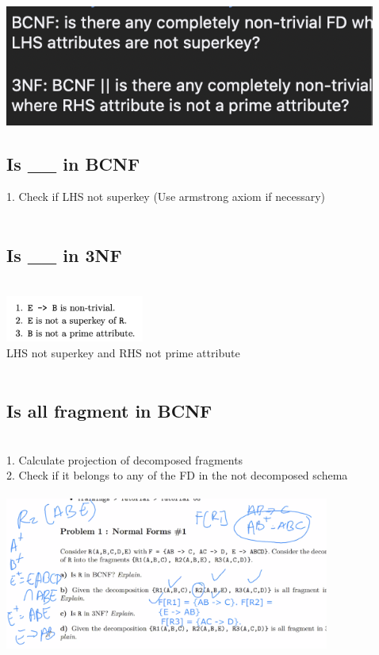 \documentclass[11pt]{article}
\begin{document}
\setlength{\columnsep}{1cm}
\begin{multicols*}{3}
\\
\includegraphics{images/b1}
\\\subsection*{Is \_\_ in BCNF}
1. Check if LHS not superkey (Use armstrong axiom if necessary)\\
\\\subsection*{Is \_\_ in 3NF}
\\
\includegraphics[height=1.5cm]{images/b5}\\
LHS not superkey and RHS not prime attribute
\\\\
\subsection*{Is all fragment in BCNF}\\
1. Calculate projection of decomposed fragments\\
2. Check if it belongs to any of the FD in the not decomposed schema\\\\
\includegraphics[height=5cm]{images/b2}

\end{multicols*}
\end{document}
